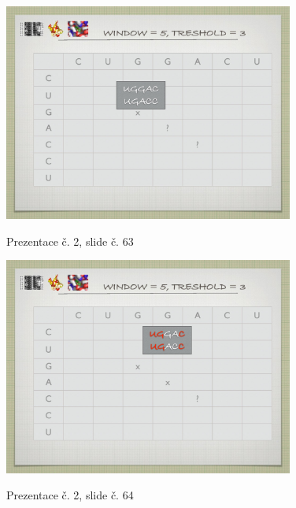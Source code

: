\documentclass[DIV=8]{scrreprt}
\begin{document}
\begin{figure}
    \caption{Prezentace č. 2, slide č. 63}
    \includegraphics[width=0.85\textwidth]{slides-2/slide-63.jpg}
    \centering
    \label{slides-2-slide-63}
\end{figure}
\begin{figure}
    \caption{Prezentace č. 2, slide č. 64}
    \includegraphics[width=0.85\textwidth]{slides-2/slide-64.jpg}
    \centering
    \label{slides-2-slide-64}
\end{figure}
\end{document}
